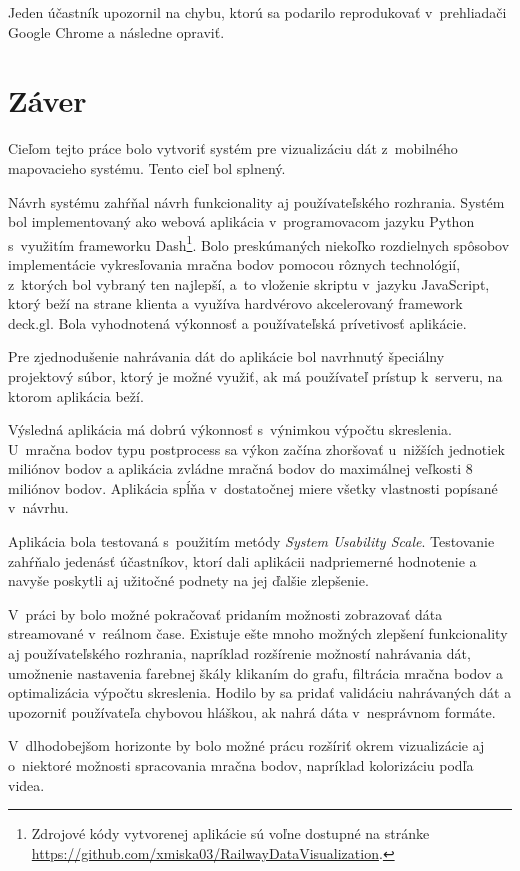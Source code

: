 Jeden účastník upozornil na chybu, ktorú sa podarilo reprodukovať v~prehliadači Google Chrome a následne opraviť.

\chapter{Záver}

Cieľom tejto práce bolo vytvoriť systém pre vizualizáciu dát z~mobilného mapovacieho systému. Tento cieľ bol splnený.

Návrh systému zahŕňal návrh funkcionality aj používateľského rozhrania. Systém bol implementovaný ako webová aplikácia v~programovacom jazyku Python s~využitím frameworku Dash\footnote{Zdrojové kódy vytvorenej aplikácie sú voľne dostupné na stránke \url{https://github.com/xmiska03/RailwayDataVisualization}.}. Bolo preskúmaných niekoľko rozdielnych spôsobov implementácie vykresľovania mračna bodov pomocou rôznych technológií, z~ktorých bol vybraný ten najlepší, a~to vloženie skriptu v~jazyku JavaScript, ktorý beží na strane klienta a využíva hardvérovo akcelerovaný framework deck.gl. Bola vyhodnotená výkonnosť a používateľská prívetivosť aplikácie.

Pre zjednodušenie nahrávania dát do aplikácie bol navrhnutý špeciálny projektový súbor, ktorý je možné využiť, ak má používateľ prístup k~serveru, na ktorom aplikácia beží.

Výsledná aplikácia má dobrú výkonnosť s~výnimkou výpočtu skreslenia. U~mračna bodov typu postprocess sa výkon začína zhoršovať u~nižších jednotiek miliónov bodov a aplikácia zvládne mračná bodov do maximálnej veľkosti 8 miliónov bodov. Aplikácia spĺňa v~dostatočnej miere všetky vlastnosti popísané v~návrhu.

Aplikácia bola testovaná s~použitím metódy \emph{System Usability Scale}. Testovanie zahŕňalo jedenásť účastníkov, ktorí dali aplikácii nadpriemerné hodnotenie a navyše poskytli aj užitočné podnety na jej ďalšie zlepšenie.

V~práci by bolo možné pokračovať pridaním možnosti zobrazovať dáta streamované v~reálnom čase. Existuje ešte mnoho možných zlepšení funkcionality aj používateľského rozhrania, napríklad rozšírenie možností nahrávania dát, umožnenie nastavenia farebnej škály klikaním do grafu, filtrácia mračna bodov a optimalizácia výpočtu skreslenia. Hodilo by sa pridať validáciu nahrávaných dát a upozorniť používateľa chybovou hláškou, ak nahrá dáta v~nesprávnom formáte.

V~dlhodobejšom horizonte by bolo možné prácu rozšíriť okrem vizualizácie aj o~niektoré možnosti spracovania mračna bodov, napríklad kolorizáciu podľa videa.


%

